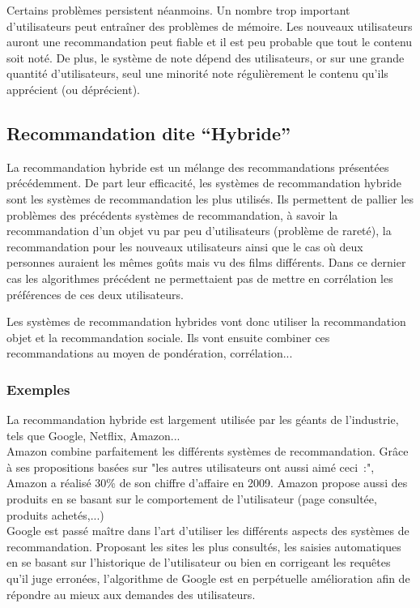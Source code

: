 \documentclass{article}
\begin{document}
Certains problèmes persistent néanmoins. Un nombre trop important d'utilisateurs peut entraîner des problèmes de mémoire. Les nouveaux utilisateurs auront une recommandation peut fiable et il est peu probable que tout le contenu soit noté. De plus, le système de note dépend des utilisateurs, or sur une grande quantité d'utilisateurs, seul une minorité note régulièrement le contenu qu'ils apprécient (ou déprécient).


\subsection{Recommandation dite “Hybride”}

La recommandation hybride est un mélange des recommandations présentées précédemment. De part leur efficacité, les systèmes de recommandation hybride sont les systèmes de recommandation les plus utilisés. Ils permettent de pallier les problèmes des précédents systèmes de recommandation, à savoir la recommandation d'un objet vu par peu d'utilisateurs (problème de rareté), la recommandation pour les nouveaux utilisateurs ainsi que le cas où deux personnes auraient les mêmes goûts mais vu des films différents. Dans ce dernier cas les algorithmes précédent ne permettaient pas de mettre en corrélation les préférences de ces deux utilisateurs.

Les systèmes de recommandation hybrides vont donc utiliser la recommandation objet et la recommandation sociale. Ils vont ensuite combiner ces recommandations au moyen de pondération, corrélation...

\subsubsection{Exemples}

La recommandation hybride est largement utilisée par les géants de l'industrie, tels que Google, Netflix, Amazon...\\

Amazon combine parfaitement les différents systèmes de recommandation. Grâce à ses propositions basées sur "les autres utilisateurs ont aussi aimé ceci~:", Amazon a réalisé 30\% de son chiffre d'affaire en 2009. Amazon propose aussi des produits en se basant sur le comportement de l'utilisateur (page consultée, produits achetés,...)\\

Google est passé maître dans l'art d'utiliser les différents aspects des systèmes de recommandation. Proposant les sites les plus consultés, les saisies automatiques en se basant sur l'historique de l'utilisateur ou bien en corrigeant les requêtes qu'il juge erronées, l'algorithme de Google est en perpétuelle amélioration afin de répondre au mieux aux demandes des utilisateurs.\\
\end{document}
